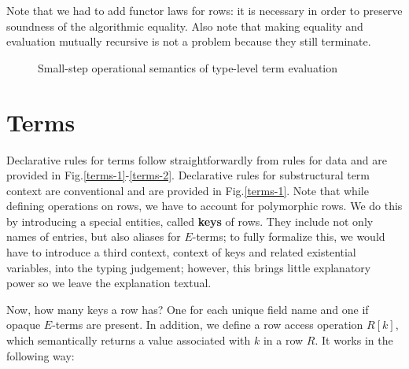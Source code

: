 \documentclass[a4paper,14pt]{extreport}
\begin{document}
Note that we had to add functor laws for rows: it is necessary in order to
preserve soundness of the algorithmic equality. Also note that making equality
and evaluation mutually recursive is not a problem because they still terminate.

\begin{figure}[h!]
    \centering
    \caption{Small-step operational semantics of type-level term evaluation}
    \label{eval}
\end{figure}

\section{Terms}

Declarative rules for terms follow straightforwardly from rules for data and are
provided in Fig.\ref{terms-1}-\ref{terms-2}. Declarative rules for substructural
term context are conventional and are provided in Fig.\ref{terms-1}. Note that
while defining operations on rows, we have to account for polymorphic rows. We
do this by introducing a special entities, called \textbf{keys} of rows. They
include not only names of entries, but also aliases for $E$-terms; to fully
formalize this, we would have to introduce a third context, context of keys and
related existential variables, into the typing judgement; however, this brings
little explanatory power so we leave the explanation textual.

Now, how many keys a row has? One for each unique field name and one if opaque
$E$-terms are present. In addition, we define a row access operation $R[k]$,
which semantically returns a value associated with $k$ in a row $R$. It works in
the following way:
\end{document}
